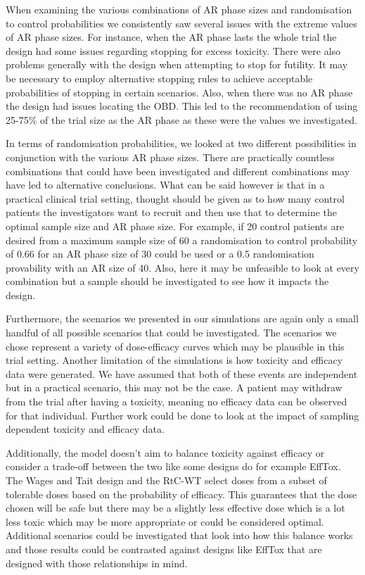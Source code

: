 When examining the various combinations of AR phase sizes and randomisation to control probabilities we consistently saw several issues with the extreme values of AR phase sizes. For instance, when the AR phase lasts the whole trial the design had some issues regarding stopping for excess toxicity. There were also problems generally with the design when attempting to stop for futility. It may be necessary to employ alternative stopping rules to achieve acceptable probabilities of stopping in certain scenarios. Also, when there was no AR phase the design had issues locating the OBD. This led to the recommendation of using 25-75\% of the trial size as the AR phase as these were the values we investigated. 

In terms of randomisation probabilities, we looked at two different possibilities in conjunction with the various AR phase sizes. There are practically countless combinations that could have been investigated and different combinations may have led to alternative conclusions. What can be said however is that in a practical clinical trial setting, thought should be given as to how many control patients the investigators want to recruit and then use that to determine the optimal sample size and AR phase size. For example, if 20 control patients are desired from a maximum sample size of 60 a randomisation to control probability of 0.66 for an AR phase size of 30 could be used or a 0.5 randomisation provability with an AR size of 40. Also, here it may be unfeasible to look at every combination but a sample should be investigated to see how it impacts the design. 

Furthermore, the scenarios we presented in our simulations are again only a small handful of all possible scenarios that could be investigated. The scenarios we chose represent a variety of dose-efficacy curves which may be plausible in this trial setting. Another limitation of the simulations is how toxicity and efficacy data were generated. We have assumed that both of these events are independent but in a practical scenario, this may not be the case. A patient may withdraw from the trial after having a toxicity, meaning no efficacy data can be observed for that individual. Further work could be done to look at the impact of sampling dependent toxicity and efficacy data. 

Additionally, the model doesn't aim to balance toxicity against efficacy or consider a trade-off between the two like some designs do for example EffTox. The Wages and Tait design and the RtC-WT select doses from a subset of tolerable doses based on the probability of efficacy. This guarantees that the dose chosen will be safe but there may be a slightly less effective dose which is a lot less toxic which may be more appropriate or could be considered optimal. Additional scenarios could be investigated that look into how this balance works and those results could be contrasted against designs like EffTox that are designed with those relationships in mind.

